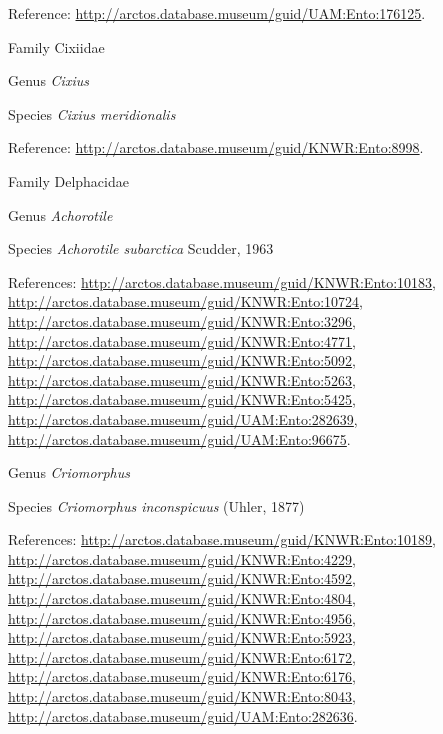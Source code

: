 \documentclass[9pt, article]{memoir}
\begin{document}
\begin{multicols}{2}
\vspace{6pt}Reference: 
\url{http://arctos.database.museum/guid/UAM:Ento:176125}.

\vspace{6pt}\noindent\hspace{24pt}Family Cixiidae


\vspace{6pt}\noindent\hspace{30pt}Genus \textit{Cixius}


\vspace{6pt}\noindent\hspace{36pt}Species \textit{Cixius meridionalis}


\vspace{6pt}Reference: 
\url{http://arctos.database.museum/guid/KNWR:Ento:8998}.

\vspace{6pt}\noindent\hspace{24pt}Family Delphacidae


\vspace{6pt}\noindent\hspace{30pt}Genus \textit{Achorotile}


\vspace{6pt}\noindent\hspace{36pt}Species \textit{Achorotile subarctica} Scudder, 1963


\vspace{6pt}References: 
\url{http://arctos.database.museum/guid/KNWR:Ento:10183}, 
\url{http://arctos.database.museum/guid/KNWR:Ento:10724}, 
\url{http://arctos.database.museum/guid/KNWR:Ento:3296}, 
\url{http://arctos.database.museum/guid/KNWR:Ento:4771}, 
\url{http://arctos.database.museum/guid/KNWR:Ento:5092}, 
\url{http://arctos.database.museum/guid/KNWR:Ento:5263}, 
\url{http://arctos.database.museum/guid/KNWR:Ento:5425}, 
\url{http://arctos.database.museum/guid/UAM:Ento:282639}, 
\url{http://arctos.database.museum/guid/UAM:Ento:96675}.

\vspace{6pt}\noindent\hspace{30pt}Genus \textit{Criomorphus}


\vspace{6pt}\noindent\hspace{36pt}Species \textit{Criomorphus inconspicuus} (Uhler, 1877)


\vspace{6pt}References: 
\url{http://arctos.database.museum/guid/KNWR:Ento:10189}, 
\url{http://arctos.database.museum/guid/KNWR:Ento:4229}, 
\url{http://arctos.database.museum/guid/KNWR:Ento:4592}, 
\url{http://arctos.database.museum/guid/KNWR:Ento:4804}, 
\url{http://arctos.database.museum/guid/KNWR:Ento:4956}, 
\url{http://arctos.database.museum/guid/KNWR:Ento:5923}, 
\url{http://arctos.database.museum/guid/KNWR:Ento:6172}, 
\url{http://arctos.database.museum/guid/KNWR:Ento:6176}, 
\url{http://arctos.database.museum/guid/KNWR:Ento:8043}, 
\url{http://arctos.database.museum/guid/UAM:Ento:282636}.


\end{multicols}
\end{document}
